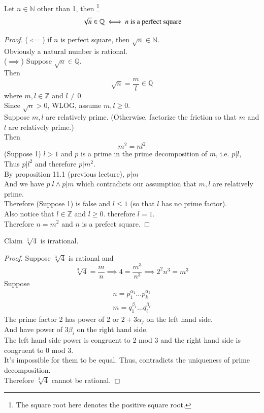 \documentclass[11pt]{article}
\begin{document}
	\begin{theorem}[Generalization]
		Let $n \in \mathbb{N}$ other than 1, then \footnote{The square root here denotes the positive square root.}
		\[
			\sqrt{n} \in \mathbb{Q} \iff n \text{{ is a perfect square}}
		\]
	\end{theorem}
	\begin{proof}
		($\impliedby$) if $n$ is perfect square, then $\sqrt{n} \in \mathbb{N}$. \\
		Obviously a natural number is rational. \\
		($\implies$) Suppose $\sqrt{n} \in \mathbb{Q}$. \\
		Then 
		\[
			\sqrt{n} = \frac{m}{l} \in \mathbb{Q}
		\]where $m, l \in \mathbb{Z}$ and $l \neq 0$. \\
		Since $\sqrt{n} > 0$, WLOG, assume $m, l \geq 0$. \\
		Suppose $m, l$ are relatively prime. (Otherwise, factorize the friction so that $m$ and $l$ are relatively prime.)\\
		Then 
		\[
			m^2 = n l^2
		\]
		(Suppose 1) $l > 1 $ and $p$ is a prime in the prime decomposition of $m$, i.e. $p | l$, \\
		Thus $p | l^2$ and therefore $p | m^2$. \\
		By proposition 11.1 (previous lecture), $p | m$ \\
		And we have $p | l \land p | m$ which contradicts our assumption that $m, l$ are relatively prime. \\
		Therefore (Suppose 1) is false and $l \leq 1$ (so that $l$ has no prime factor). \\
		Also notice that $l \in \mathbb{Z}$ and $l \geq 0$. therefore $l = 1$. \\
		Therefore $n = m^2$ and $n$ is a prefect square.
	\end{proof}
	
	\begin{example}
		Claim $\sqrt[3]{4}$ is irrational.
	\end{example}
	\begin{proof}
		Suppose $\sqrt[3]{4}$ is rational and 
		\[
			\sqrt[3]{4} = \frac{m}{n} \implies 4 = \frac{m^3}{n^3} \implies 2^2 n^3 = m^3
		\]
		Suppose 
		\begin{gather*}
			n = p_1^{\alpha_1} \dots p_k^{\alpha_k} \\
			m = q_1^{\beta_1} \dots q_\ell^{\beta_{\ell}}
		\end{gather*}
		The prime factor 2 has power of 2 or $2 + 3\alpha_j$ on the left hand side. \\
		And have power of $3\beta_i$ on the right hand side. \\
		The left hand side power is congruent to 2 mod 3 and the right hand side is congruent to 0 mod 3. \\
		It's impossible for them to be equal. Thus, contradicts the uniqueness of prime decomposition. \\
		Therefore $\sqrt[3]{4}$ cannot be rational.
	\end{proof}
	
\end{document}
